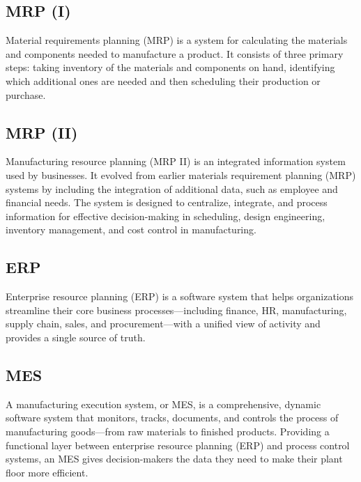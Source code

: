 \subsection{MRP (I)} Material requirements planning (MRP) is a system for calculating the materials and components needed to manufacture a product. It consists of three primary steps: taking inventory of the materials and components on hand, identifying which additional ones are needed and then scheduling their production or purchase. \cite{techtarget_mrp}

\subsection{MRP (II)} Manufacturing resource planning (MRP II) is an integrated information system used by businesses. It evolved from earlier materials requirement planning (MRP) systems by including the integration of additional data, such as employee and financial needs. The system is designed to centralize, integrate, and process information for effective decision-making in scheduling, design engineering, inventory management, and cost control in manufacturing. \cite{investopedia_mrpii}

\subsection{ERP} Enterprise resource planning (ERP) is a software system that helps organizations streamline their core business processes—including finance, HR, manufacturing, supply chain, sales, and procurement—with a unified view of activity and provides a single source of truth. \cite{sap_erp}

\subsection{MES} A manufacturing execution system, or MES, is a comprehensive, dynamic software system that monitors, tracks, documents, and controls the process of manufacturing goods—from raw materials to finished products. Providing a functional layer between enterprise resource planning (ERP) and process control systems, an MES gives decision-makers the data they need to make their plant floor more efficient. \cite{sap_mes}